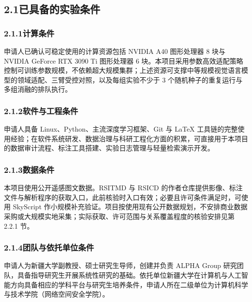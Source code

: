 
\subsection*{2.1\quad 已具备的实验条件}

\subsubsection*{2.1.1\quad 计算条件}

申请人已确认可稳定使用的计算资源包括 NVIDIA A40 图形处理器 8 块与 NVIDIA GeForce RTX 3090 Ti 图形处理器 6 块。本项目采用参数高效适配策略控制可训练参数规模，不依赖超大规模集群；上述资源可支撑中等规模视觉语言模型的领域适配、三臂受控对照，以及每组实验不少于 3 个随机种子的重复运行与多组消融的排队执行。

\subsubsection*{2.1.2\quad 软件与工程条件}

申请人具备 Linux、Python、主流深度学习框架、Git 与 \LaTeX{} 工具链的完整使用经验；在软件系统研发、数据治理与科研工程化方面的积累，可直接用于本项目的数据审计流程、标注工具搭建、实验日志管理与轻量检索演示开发。

\subsubsection*{2.1.3\quad 数据条件}

本项目使用公开遥感图文数据。RSITMD\cite{yuan2022amfmn} 与 RSICD\cite{lu2018rsicd} 的作者仓库提供影像、标注文件与解析程序的获取入口，此前核验时入口有效；必要且许可条件满足时，可使用 SkyScript\cite{wang2024skyscript} 作小规模补充验证。项目按使用现有公开数据规划，不安排商业数据采购或大规模实地采集；实际获取、许可范围与关系覆盖程度的核验安排见第 2.2.1 节。

\subsubsection*{2.1.4\quad 团队与依托单位条件}

申请人为新疆大学副教授、硕士研究生导师，创建并负责 ALPHA Group 研究团队，具备指导研究生开展系统性研究的基础。依托单位新疆大学在计算机与人工智能方向具备相应的学科平台与研究生培养条件，申请人所在二级单位为计算机科学与技术学院（网络空间安全学院）。

